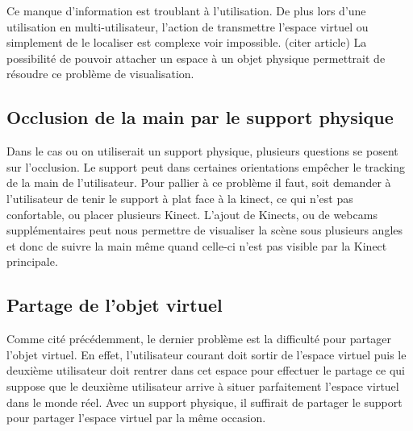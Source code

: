 Ce manque d’information est troublant à l’utilisation. De plus lors d’une utilisation en multi-utilisateur, l’action de transmettre l’espace virtuel ou simplement de le localiser est complexe voir impossible. (citer article) La possibilité de pouvoir attacher un espace à un objet physique permettrait de résoudre ce problème de visualisation.


\subsection{Occlusion de la main par le support physique}

Dans le cas ou on utiliserait un support physique, plusieurs questions se posent sur l’occlusion. 
Le support peut dans certaines orientations empêcher le tracking de la main de l’utilisateur. Pour pallier à ce problème il faut, soit demander à l’utilisateur de tenir le support à plat face à la kinect, ce qui n’est pas confortable, ou placer plusieurs Kinect.
L’ajout de Kinects, ou de webcams supplémentaires peut nous permettre de visualiser la scène sous plusieurs angles et donc de suivre la main même quand celle-ci n’est pas visible par la Kinect principale.  

\subsection{Partage de l’objet virtuel}

Comme cité précédemment, le dernier problème est la difficulté pour partager l’objet virtuel. En effet, l’utilisateur courant doit sortir de l’espace virtuel puis le deuxième utilisateur doit rentrer dans cet espace pour effectuer le partage ce qui suppose que le deuxième utilisateur arrive à situer parfaitement l’espace virtuel dans le monde réel. Avec un support physique, il suffirait de partager le support pour partager l’espace virtuel par la même occasion.  
